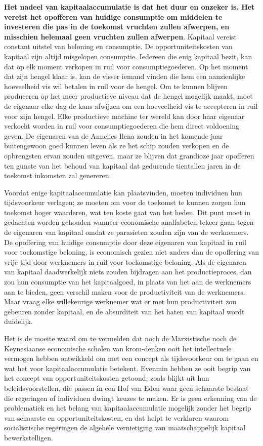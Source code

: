 \documentclass[
  a5paper,
  smalldemyvopaper,11pt,twoside,onecolumn,openright,extrafontsizes,
hidelinks]{memoir}
\begin{document}
\textbf{Het nadeel van kapitaalaccumulatie is dat het duur en onzeker
is. Het vereist het opofferen van huidige consumptie om middelen te
investeren die pas in de toekomst vruchten zullen afwerpen, en misschien
helemaal geen vruchten zullen afwerpen}. Kapitaal vereist constant
uitstel van beloning en consumptie. De opportuniteitskosten van kapitaal
zijn altijd misgelopen consumptie. Iedereen die enig kapitaal bezit, kan
dat op elk moment verkopen in ruil voor consumptiegoederen. Op het
moment dat zijn hengel klaar is, kan de visser iemand vinden die hem een
aanzienlijke hoeveelheid vis wil betalen in ruil voor de hengel. Om te
kunnen blijven produceren op het meer productieve niveau dat de hengel
mogelijk maakt, moet de eigenaar elke dag de kans afwijzen om een
hoeveelheid vis te accepteren in ruil voor zijn hengel. Elke productieve
machine ter wereld kan door haar eigenaar verkocht worden in ruil voor
consumptiegoederen die hem direct voldoening geven. De eigenaren van de
Annelies Ilena zouden in het komende jaar buitengewoon goed kunnen leven
als ze het schip zouden verkopen en de opbrengsten ervan zouden
uitgeven, maar ze blijven dat grandioze jaar opofferen ten gunste van
het behoud van kapitaal dat gedurende tientallen jaren in de toekomst
inkomsten zal genereren.

Voordat enige kapitaalaccumulatie kan plaatsvinden, moeten individuen
hun tijdsvoorkeur verlagen; ze moeten om voor de toekomst te kunnen
zorgen hun toekomst hoger waarderen, wat ten koste gaat van het heden.
Dit punt moet in gedachten worden gehouden wanneer economische
analfabeten tekeer gaan tegen de eigenaren van kapitaal omdat ze
parasieten zouden zijn van de werknemers. De opoffering van huidige
consumptie door deze eigenaren van kapitaal in ruil voor toekomstige
beloning, is economisch gezien niet anders dan de opoffering van vrije
tijd door werknemers in ruil voor toekomstige beloning. Als de eigenaren
van kapitaal daadwerkelijk niets zouden bijdragen aan het
productieproces, dan zou hun consumptie van het kapitaalgoed, in plaats
van het aan de werknemers aan te bieden, geen verschil maken voor de
productiviteit van de werknemers. Maar vraag elke willekeurige werknemer
wat er met hun productiviteit zou gebeuren zonder kapitaal, en de
absurditeit van het haten van kapitaal wordt duidelijk.

Het is de moeite waard om te vermelden dat noch de Marxistische noch de
Keynesiaanse economische scholen van krom-denken ooit het intellectuele
vermogen hebben ontwikkeld om met een concept als tijdsvoorkeur om te
gaan en wat het voor kapitaalaccumulatie betekent. Evenmin hebben ze
ooit begrip van het concept van opportuniteitskosten getoond, zoals
blijkt uit hun beleidsvoorstellen, die passen in een Hof van Eden waar
geen schaarste bestaat die regeringen of individuen dwingt keuzes te
maken. Er is geen erkenning van de problematiek en het belang van
kapitaalaccumulatie mogelijk zonder het begrip van schaarste en
opportuniteitskosten, en dat helpt te verklaren waarom socialistische
regeringen de algehele vernietiging van maatschappelijk kapitaal
bewerkstelligen.
\end{document}
